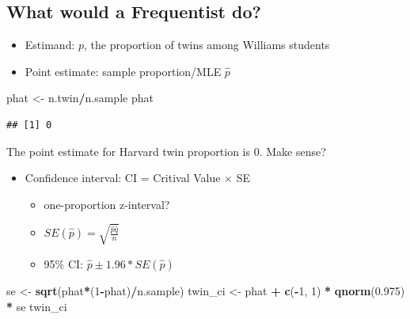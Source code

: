 \documentclass[
]{book}
\newenvironment{Shaded}{\begin{snugshade}}{\end{snugshade}}
\newcommand{\DecValTok}[1]{\textcolor[rgb]{0.00,0.00,0.81}{#1}}
\newcommand{\FloatTok}[1]{\textcolor[rgb]{0.00,0.00,0.81}{#1}}
\newcommand{\FunctionTok}[1]{\textcolor[rgb]{0.13,0.29,0.53}{\textbf{#1}}}
\newcommand{\NormalTok}[1]{#1}
\newcommand{\OtherTok}[1]{\textcolor[rgb]{0.56,0.35,0.01}{#1}}
\newcommand{\SpecialCharTok}[1]{\textcolor[rgb]{0.81,0.36,0.00}{\textbf{#1}}}
\providecommand{\tightlist}{%
  \setlength{\itemsep}{0pt}\setlength{\parskip}{0pt}}
\begin{document}
\hypertarget{what-would-a-frequentist-do}{%
\subsection{What would a Frequentist do?}\label{what-would-a-frequentist-do}}

\begin{itemize}
\tightlist
\item
  Estimand: \(p\), the proportion of twins among Williams students
\item
  Point estimate: sample proportion/MLE \(\hat{p}\)
\end{itemize}

\begin{Shaded}
\begin{Highlighting}[]
\NormalTok{phat }\OtherTok{\textless{}{-}}\NormalTok{ n.twin}\SpecialCharTok{/}\NormalTok{n.sample}
\NormalTok{phat}
\end{Highlighting}
\end{Shaded}

\begin{verbatim}
## [1] 0
\end{verbatim}

The point estimate for Harvard twin proportion is 0. Make sense?

\begin{itemize}
\tightlist
\item
  Confidence interval: CI = Critival Value \(\times\) SE

  \begin{itemize}
  \tightlist
  \item
    one-proportion z-interval?
  \item
    \(SE(\hat{p}) = \sqrt{\frac{\hat{p}\hat{q}}{n}}\)
  \item
    95\% CI: \(\hat{p} \pm 1.96 * SE(\hat{p})\)
  \end{itemize}
\end{itemize}

\begin{Shaded}
\begin{Highlighting}[]
\NormalTok{se }\OtherTok{\textless{}{-}} \FunctionTok{sqrt}\NormalTok{(phat}\SpecialCharTok{*}\NormalTok{(}\DecValTok{1}\SpecialCharTok{{-}}\NormalTok{phat)}\SpecialCharTok{/}\NormalTok{n.sample)}
\NormalTok{twin\_ci }\OtherTok{\textless{}{-}}\NormalTok{ phat }\SpecialCharTok{+} \FunctionTok{c}\NormalTok{(}\SpecialCharTok{{-}}\DecValTok{1}\NormalTok{, }\DecValTok{1}\NormalTok{) }\SpecialCharTok{*} \FunctionTok{qnorm}\NormalTok{(}\FloatTok{0.975}\NormalTok{) }\SpecialCharTok{*}\NormalTok{ se}
\NormalTok{twin\_ci}
\end{Highlighting}
\end{Shaded}
\end{document}
